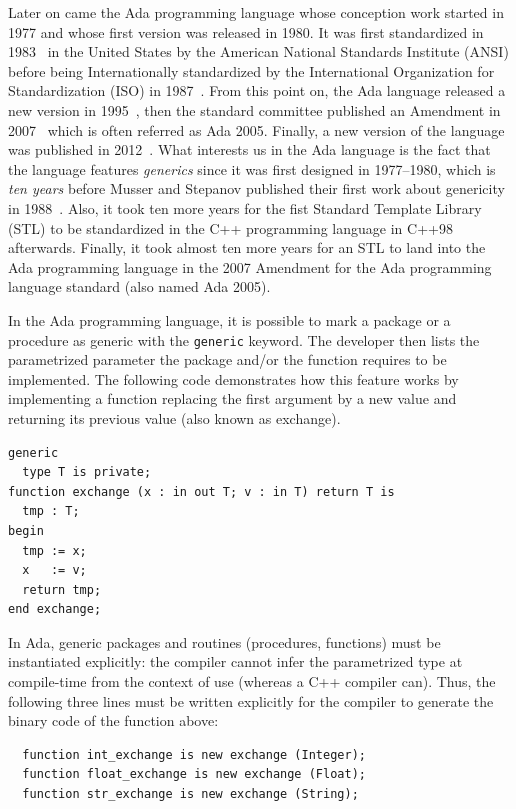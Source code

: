 Later on came the Ada programming language whose conception work started in 1977 and whose first version was released in
1980. It was first standardized in 1983~\parencite{ansi.1983.ada} in the United States by the American National
Standards Institute (ANSI) before being Internationally standardized by the International Organization for
Standardization (ISO) in 1987~\parencite{iso.1987.ada}. From this point on, the Ada language released a new version in
1995~\parencite{iso.1995.ada,iso.1995.ada.corr}, then the standard committee published an Amendment in
2007~\parencite{iso.1995.ada.amend} which is often referred as Ada 2005. Finally, a new version of the language was
published in 2012~\parencite{iso.2012.ada,iso.2012.ada.corr}. What interests us in the Ada language is the fact that the
language features \emph{generics} since it was first designed in 1977--1980, which is \emph{ten years} before Musser and
Stepanov published their first work about genericity in 1988~\parencite{musser.1988.generic}. Also, it took ten more
years for the fist Standard Template Library (STL) to be standardized in the C++ programming language in
C++98~\parencite{iso.1998.cpp} afterwards. Finally, it took almost ten more years for an STL to land into the Ada
programming language in the 2007 Amendment for the Ada programming language standard (also named Ada 2005).

In the Ada programming language, it is possible to mark a package or a procedure as generic with the \texttt{generic}
keyword. The developer then lists the parametrized parameter the package and/or the function requires to be implemented.
The following code demonstrates how this feature works by implementing a function replacing the first argument by a new
value and returning its previous value (also known as exchange).

\begin{verbatim}
generic
  type T is private;
function exchange (x : in out T; v : in T) return T is
  tmp : T;
begin
  tmp := x;
  x   := v;
  return tmp;
end exchange;
\end{verbatim}

In Ada, generic packages and routines (procedures, functions) must be instantiated explicitly: the compiler cannot infer
the parametrized type at compile-time from the context of use (whereas a C++ compiler can). Thus, the following three
lines must be written explicitly for the compiler to generate the binary code of the function above:
\begin{verbatim}
  function int_exchange is new exchange (Integer);
  function float_exchange is new exchange (Float);
  function str_exchange is new exchange (String);
\end{verbatim}


